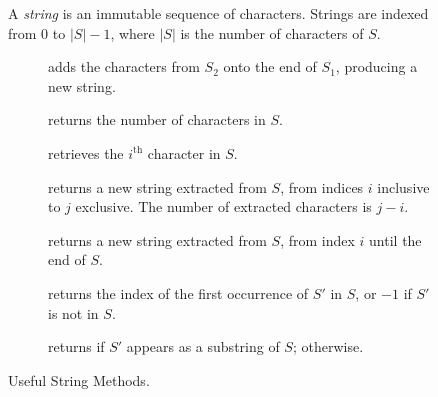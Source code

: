 \begin{figure}[tp]
  \small
  \begin{tcolorbox}[title=String Class]
    A \textit{string} is an immutable sequence of characters. Strings are indexed from $0$ to $|S|-1$, where $|S|$ is the number of characters of $S$.
    \vspace{2ex}
  \begin{description}
    \item[] adds the characters from $S_2$ onto the end of $S_1$, producing a new string.
    \item[] returns the number of characters in $S$.
    \item[] retrieves the $i^\text{th}$ character in $S$.
    \item[] returns a new string extracted from $S$, from indices $i$ inclusive to $j$ exclusive. The number of extracted characters is $j-i$.
    \item[] returns a new string extracted from $S$, from index $i$ until the end of $S$.
    \item[] returns the index of the first occurrence of $S'$ in $S$, or $-1$ if $S'$ is not in $S$.
    \item[] returns  if $S'$ appears as a substring of $S$;  otherwise.
  \end{description}
\end{tcolorbox}
  \caption{Useful String Methods.}
  \label{fig:strings}
\end{figure}